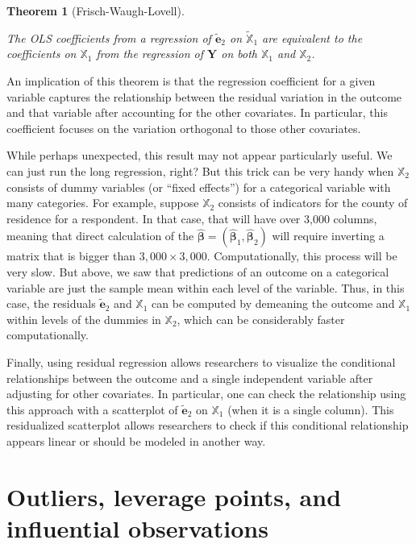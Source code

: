 \documentclass[
  letterpaper,
  DIV=11,
  numbers=noendperiod]{scrreprt}
\newcommand{\mb}{\symbf}
\newcommand{\Xmat}{\mathbb{X}}
\newcommand{\bhat}{\widehat{\mb{\beta}}}
\theoremstyle{plain}
\newtheorem{theorem}{Theorem}[chapter]
\theoremstyle{definition}
\theoremstyle{definition}
\theoremstyle{remark}
\begin{document}
\begin{theorem}[Frisch-Waugh-Lovell]\protect\hypertarget{thm-fwl}{}\label{thm-fwl}

The OLS coefficients from a regression of \(\widetilde{\mb{e}}_{2}\) on
\(\widetilde{\Xmat}_1\) are equivalent to the coefficients on
\(\Xmat_{1}\) from the regression of \(\mb{Y}\) on both \(\Xmat_{1}\)
and \(\Xmat_2\).

\end{theorem}

An implication of this theorem is that the regression coefficient for a
given variable captures the relationship between the residual variation
in the outcome and that variable after accounting for the other
covariates. In particular, this coefficient focuses on the variation
orthogonal to those other covariates.

While perhaps unexpected, this result may not appear particularly
useful. We can just run the long regression, right? But this trick can
be very handy when \(\Xmat_2\) consists of dummy variables (or ``fixed
effects'') for a categorical variable with many categories. For example,
suppose \(\Xmat_2\) consists of indicators for the county of residence
for a respondent. In that case, that will have over 3,000 columns,
meaning that direct calculation of the
\(\bhat = (\bhat_{1}, \bhat_{2})\) will require inverting a matrix that
is bigger than \(3,000 \times 3,000\). Computationally, this process
will be very slow. But above, we saw that predictions of an outcome on a
categorical variable are just the sample mean within each level of the
variable. Thus, in this case, the residuals \(\widetilde{\mb{e}}_2\) and
\(\Xmat_1\) can be computed by demeaning the outcome and \(\Xmat_1\)
within levels of the dummies in \(\Xmat_2\), which can be considerably
faster computationally.

Finally, using residual regression allows researchers to visualize the
conditional relationships between the outcome and a single independent
variable after adjusting for other covariates. In particular, one can
check the relationship using this approach with a scatterplot of
\(\widetilde{\mb{e}}_2\) on \(\Xmat_1\) (when it is a single column).
This residualized scatterplot allows researchers to check if this
conditional relationship appears linear or should be modeled in another
way.

\hypertarget{outliers-leverage-points-and-influential-observations}{%
\section{Outliers, leverage points, and influential
observations}\label{outliers-leverage-points-and-influential-observations}}
\end{document}
